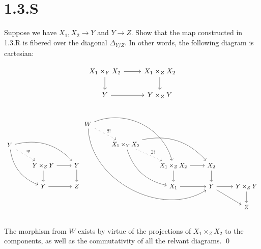 \documentclass{article}
\begin{document}
\section{1.3.S}
\begin{theorem}
    Suppose we have $X_1,X_2 \to Y$ and $Y \to Z$. Show that
    the map constructed in 1.3.R is fibered over the diagonal
    $\Delta_{Y/Z}$. In other words, the following diagram is cartesian:

    \[\begin{tikzcd}
            {X_1 \times_YX_2} & {X_1 \times_ZX_2} \\
            Y                 & {Y\times_ZY}
            \arrow[from=1-1, to=2-1]
            \arrow[from=1-1, to=1-2]
            \arrow[from=1-2, to=2-2]
            \arrow[from=2-1, to=2-2]
        \end{tikzcd}\]
\end{theorem}
\[
    \begin{tikzcd}
        Y \ar[rdd, bend right] \ar[rrd, bend left] \ar[rd, "\exists!", dotted] &                            &          \\
                                                                               & Y \times_Z Y \ar[d] \ar[r] & Y \ar[d] \\
                                                                               & Y \ar[r]                   & Z
    \end{tikzcd}
    \begin{tikzcd}
        W \arrow[rrrddd, bend right=60] \arrow[rrdd, bend left=49] \arrow[rd, "\exists!", dotted] &                                                                                                &                                      &                        &                       \\
                                                                                                  & X_1 \times_Y X_2 \arrow[rdd, bend right] \arrow[rrd, bend left] \arrow[rd, "\exists!", dotted] &                                      &                        &                       \\
                                                                                                  &                                                                                                & X_1 \times_Z X_2 \arrow[r] \arrow[d] & X_2 \arrow[d]          &                       \\
                                                                                                  &                                                                                                & X_1 \arrow[r]                        & Y \arrow[rd] \arrow[r] & Y\times_Z Y \arrow[d] \\
                                                                                                  &                                                                                                &                                      &                        & Z
    \end{tikzcd}
\]

The morphism from $W$ exists by virtue of the projections of
$X_1 \times_Z X_2$ to the components, as well as the commutativity of all
the relvant diagrams. \qed
\end{document}

